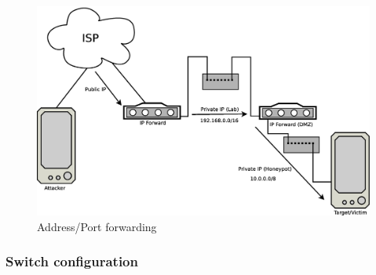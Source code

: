\begin{figure}[h]
\begin{center}
	\includegraphics[scale=0.25]{Images/Forward.eps}
\caption{Address/Port forwarding}
\label{fig:Forward}
\end{center}
\end{figure}

\subsubsection{Switch configuration}

